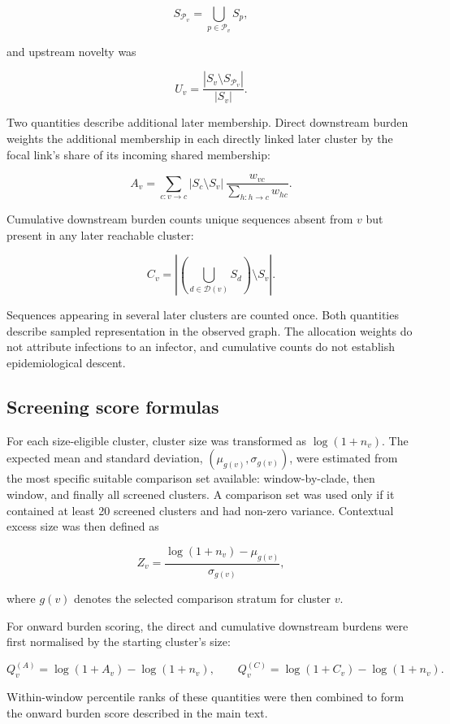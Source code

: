 \[
    S_{\mathcal{P}_v}=\bigcup_{p\in\mathcal{P}_v} S_p,
\]

and upstream novelty was

\[
    U_v=\frac{|S_v\setminus S_{\mathcal{P}_v}|}{|S_v|}.
\]

Two quantities describe additional later membership. Direct downstream burden weights the additional membership in each directly linked later cluster by the focal link's share of its incoming shared membership:

\[
    A_v=\sum_{c:v\rightarrow c}
    |S_c\setminus S_v|\,
    \frac{w_{vc}}{\sum_{h:h\rightarrow c} w_{hc}} .
\]

Cumulative downstream burden counts unique sequences absent from $v$ but present in any later reachable cluster:

\[
    C_v=
    \left|
    \left(\bigcup_{d\in\mathcal{D}(v)} S_d\right)\setminus S_v
    \right|.
\]

Sequences appearing in several later clusters are counted once. Both quantities describe sampled representation in the observed graph. The allocation weights do not attribute infections to an infector, and cumulative counts do not establish epidemiological descent.

\subsection{Screening score formulas}

For each size-eligible cluster, cluster size was transformed as $\log(1+n_v)$. The expected mean and standard deviation, $(\mu_{g(v)},\sigma_{g(v)})$, were estimated from the most specific suitable comparison set available: window-by-clade, then window, and finally all screened clusters. A comparison set was used only if it contained at least 20 screened clusters and had non-zero variance. Contextual excess size was then defined as

\[
    Z_v = \frac{\log(1+n_v)-\mu_{g(v)}}{\sigma_{g(v)}} ,
\]

where $g(v)$ denotes the selected comparison stratum for cluster $v$.

For onward burden scoring, the direct and cumulative downstream burdens were first normalised by the starting cluster's size:

\[
    Q_v^{(A)} = \log(1+A_v)-\log(1+n_v),
    \qquad
    Q_v^{(C)} = \log(1+C_v)-\log(1+n_v).
\]

Within-window percentile ranks of these quantities were then combined to form the onward burden score described in the main text.

